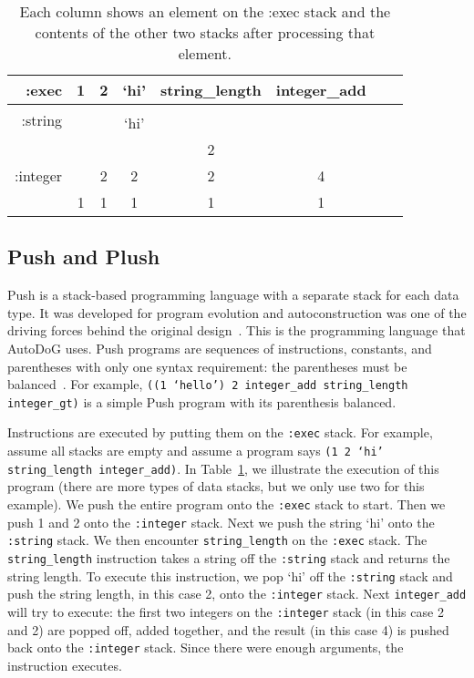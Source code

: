 \documentclass{sig-alternate}
\begin{document}
\begin{table}
	\centering
	\begin{tabular}{|r|c|c|c|c|c|c|c|}
		\hline
		:exec & 1 & 2 & `hi' & string\_length & integer\_add \\
		\hline
		\hline
		\multirow{2}{*}{:string} & & & & & \\
		& & & `hi' &  &  \\
		\hline
		\multirow{3}{*}{:integer} & & & & 2 & \\
		& & 2 & 2 & 2 & 4 \\
		& 1 & 1 & 1 & 1 & 1\\
		\hline
	\end{tabular}
	\caption{Each column shows an element on the :exec stack and the contents of the other two stacks after processing that element.}
	\label{tab:push}
\end{table}

\subsection{Push and Plush}
\label{sec:push}
Push is a stack-based programming language with a separate stack for each data type. It was developed for program evolution and autoconstruction was one of the driving forces behind the original design~\cite{spector:2016}. This is the programming language that AutoDoG uses. Push programs are sequences of instructions, constants, and parentheses with only one syntax requirement: the parentheses must be balanced~\cite{lee:2001}. For example, \texttt{((1 `hello') 2 integer\_add string\_length integer\_gt)} is a simple Push program with its parenthesis balanced.

Instructions are executed by putting them on the \texttt{:exec} stack. For example, assume all stacks are empty and assume a program says \texttt{(1 2 `hi' string\_length integer\_add)}. In Table~\ref{tab:push}, we illustrate the execution of this program (there are more types of data stacks, but we only use two for this example). We push the entire program onto the \texttt{:exec} stack to start. Then we push 1 and 2 onto the \texttt{:integer} stack. Next we push the string `hi' onto the \texttt{:string} stack. We then encounter \texttt{string\_length} on the \texttt{:exec} stack. The \texttt{string\_length} instruction takes a string off the \texttt{:string} stack and returns the string length. To execute this instruction, we pop `hi' off the \texttt{:string} stack and push the string length, in this case 2, onto the \texttt{:integer} stack. Next \texttt{integer\_add} will try to execute: the first two integers on the \texttt{:integer} stack (in this case 2 and 2) are popped off, added together, and the result (in this case 4) is pushed back onto the \texttt{:integer} stack. Since there were enough arguments, the instruction executes.~\cite{lee:tutorial}
\end{document}
